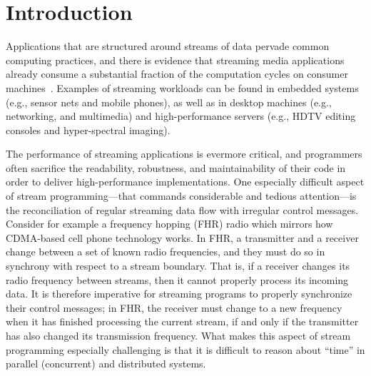 \section{Introduction}


Applications that are structured around streams of data pervade common
computing  practices,  and  there  is evidence  that  streaming  media
applications already consume a substantial fraction of the computation
cycles    on    consumer   machines~\cite{rixner98bandwidthefficient}.
Examples  of streaming  workloads  can be  found  in embedded  systems
(e.g., sensor nets and mobile  phones), as well as in desktop machines
(e.g., networking, and  multimedia) and high-performance servers (e.g.,
HDTV editing consoles and hyper-spectral imaging). 

The performance  of streaming  applications is evermore  critical, and
programmers   often  sacrifice   the   readability,  robustness,   and
maintainability  of their  code in  order to  deliver high-performance
implementations.    One   especially   difficult  aspect   of   stream
programming---that  commands considerable  and  tedious attention---is
the  reconciliation  of regular  streaming  data  flow with  irregular
control messages. Consider for example a frequency hopping (FHR) radio
which mirrors how  CDMA-based cell phone technology works.   In FHR, a
transmitter  and  a receiver  change  between  a  set of  known  radio
frequencies, and they must do so in synchrony with respect to a stream
boundary. That is,  if a receiver changes its  radio frequency between
streams,  then it  cannot  properly  process its  incoming  data.  It  is
therefore imperative  for streaming programs  to properly synchronize
their  control messages; in  FHR, the  receiver must  change to  a new
frequency when it  has finished processing the current  stream, if and
only if  the transmitter has also changed  its transmission frequency.
What makes this aspect of stream programming especially challenging is
that it is difficult to reason about ``time'' in parallel (concurrent)
and distributed systems.


